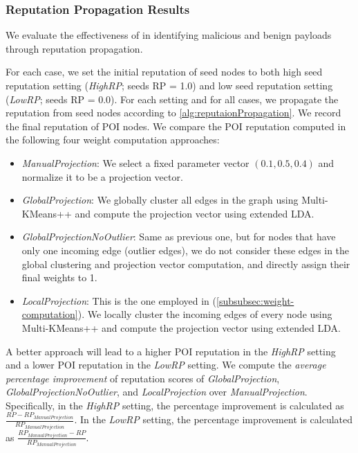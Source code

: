 \subsubsection{Reputation Propagation Results}
\label{subsec:reputation-results}

We evaluate the effectiveness of \tool in identifying malicious and benign payloads through reputation propagation.

For each case, we set the initial reputation of seed nodes to both high seed reputation setting (\emph{HighRP}; seeds RP = 1.0) and low seed reputation setting (\emph{LowRP}; seeds RP = 0.0).
For each setting and for all cases, we propagate the reputation from seed nodes according to \cref{alg:reputaionPropagation}. We record the final reputation of POI nodes.
%
We compare the POI reputation computed in the following four weight computation approaches:

\begin{itemize}[noitemsep, topsep=1pt, partopsep=1pt, listparindent=\parindent, leftmargin=*]
    
    \item \emph{ManualProjection}: We select a fixed parameter vector $(0.1, 0.5, 0.4)$ and normalize it to be a projection vector.
    
    \item \emph{GlobalProjection}: We globally cluster all edges in the graph using Multi-KMeans++ and compute the projection vector using extended LDA. 
    
    \item \emph{GlobalProjectionNoOutlier}: Same as previous one, but for nodes that have only one incoming edge (\ie outlier edges), we do not consider these edges in the global clustering and projection vector computation, and directly assign their final weights to 1.

    \item \emph{LocalProjection}: This is the one employed in \tool (\cref{subsubsec:weight-computation}). We locally cluster the incoming edges of every node using Multi-KMeans++ and compute the projection vector using extended LDA.
    
\end{itemize}

A better approach will lead to a higher POI reputation in the \emph{HighRP} setting and a lower POI reputation in the \emph{LowRP} setting.
We compute the \emph{average percentage improvement} of reputation scores of \emph{GlobalProjection}, \emph{GlobalProjectionNoOutlier}, and \emph{LocalProjection} over \emph{ManualProjection}.
Specifically, in the \emph{HighRP} setting, the percentage improvement is calculated as $\frac{RP - RP_{ManualProjection}}{RP_{ManualProjection}}$. In the \emph{LowRP} setting, the percentage improvement is calculated as $\frac{RP_{ManualProjection}-RP}{RP_{ManualProjection}}$.


